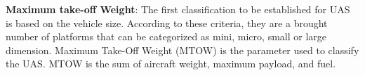 \textbf{Maximum take-off Weight}: The first classification to be established for UAS is based on the vehicle size. According to these criteria, they are a brought number of platforms that can be categorized as mini, micro, small or large dimension. Maximum Take-Off Weight (MTOW) is the parameter used to classify the UAS. MTOW is the sum of aircraft weight, maximum payload, and fuel.\cite{ICAO}


